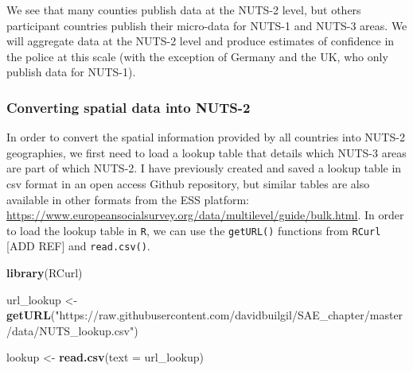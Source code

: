 \documentclass[
]{article}
\newenvironment{Shaded}{\begin{snugshade}}{\end{snugshade}}
\newcommand{\CommentTok}[1]{\textcolor[rgb]{0.56,0.35,0.01}{\textit{#1}}}
\newcommand{\DataTypeTok}[1]{\textcolor[rgb]{0.13,0.29,0.53}{#1}}
\newcommand{\KeywordTok}[1]{\textcolor[rgb]{0.13,0.29,0.53}{\textbf{#1}}}
\newcommand{\NormalTok}[1]{#1}
\newcommand{\OperatorTok}[1]{\textcolor[rgb]{0.81,0.36,0.00}{\textbf{#1}}}
\newcommand{\StringTok}[1]{\textcolor[rgb]{0.31,0.60,0.02}{#1}}
\begin{document}
\begin{Shaded}
\end{Shaded}

We see that many counties publish data at the NUTS-2 level, but others
participant countries publish their micro-data for NUTS-1 and NUTS-3
areas. We will aggregate data at the NUTS-2 level and produce estimates
of confidence in the police at this scale (with the exception of Germany
and the UK, who only publish data for NUTS-1).

\hypertarget{converting-spatial-data-into-nuts-2}{%
\subsubsection{Converting spatial data into
NUTS-2}\label{converting-spatial-data-into-nuts-2}}

In order to convert the spatial information provided by all countries
into NUTS-2 geographies, we first need to load a lookup table that
details which NUTS-3 areas are part of which NUTS-2. I have previously
created and saved a lookup table in csv format in an open access Github
repository, but similar tables are also available in other formats from
the ESS platform:
\url{https://www.europeansocialsurvey.org/data/multilevel/guide/bulk.html}.
In order to load the lookup table in \texttt{R}, we can use the
\texttt{getURL()} functions from \texttt{RCurl} {[}ADD REF{]} and
\texttt{read.csv()}.

\begin{Shaded}
\begin{Highlighting}[]
\KeywordTok{library}\NormalTok{(RCurl)}

\NormalTok{url_lookup <-}\StringTok{ }\KeywordTok{getURL}\NormalTok{(}\StringTok{"https://raw.githubusercontent.com/davidbuilgil/SAE_chapter/master/data/NUTS_lookup.csv"}\NormalTok{)}

\NormalTok{lookup <-}\StringTok{ }\KeywordTok{read.csv}\NormalTok{(}\DataTypeTok{text =}\NormalTok{ url_lookup)}
\end{Highlighting}
\end{Shaded}
\end{document}
